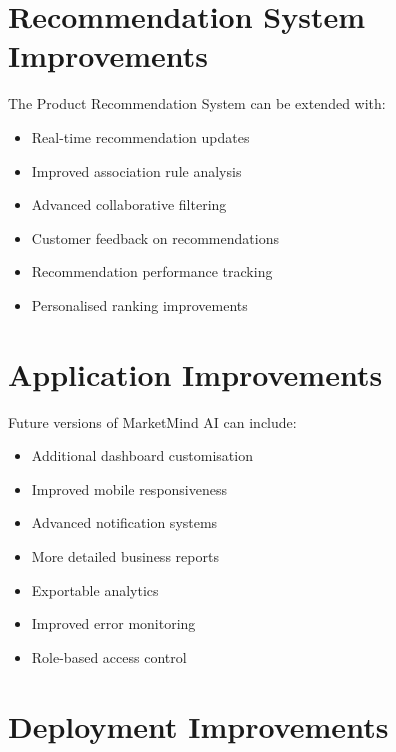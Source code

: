 \documentclass[12pt,a4paper]{report}
\begin{document}

\section{Recommendation System Improvements}

The Product Recommendation System can be extended with:

\begin{itemize}
    \item Real-time recommendation updates
    \item Improved association rule analysis
    \item Advanced collaborative filtering
    \item Customer feedback on recommendations
    \item Recommendation performance tracking
    \item Personalised ranking improvements
\end{itemize}



\section{Application Improvements}

Future versions of MarketMind AI can include:

\begin{itemize}
    \item Additional dashboard customisation
    \item Improved mobile responsiveness
    \item Advanced notification systems
    \item More detailed business reports
    \item Exportable analytics
    \item Improved error monitoring
    \item Role-based access control
\end{itemize}



\section{Deployment Improvements}
\end{document}
